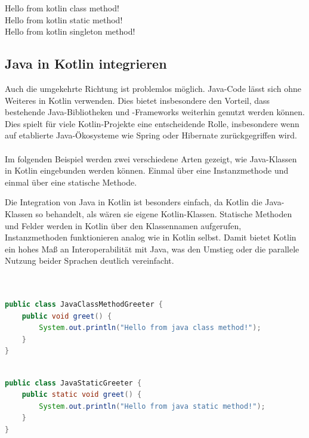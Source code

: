 \documentclass[11pt]{article}
\begin{document}
    \begin{tcolorbox}[colback=black!5!white, colframe=black, title=Ausgabe]
        Hello from kotlin class method!\\
        Hello from kotlin static method!\\
        Hello from kotlin singleton method!
    \end{tcolorbox}
    
    \subsection{Java in Kotlin integrieren}
    Auch die umgekehrte Richtung ist problemlos möglich.
    Java-Code lässt sich ohne Weiteres in Kotlin verwenden.
    Dies bietet insbesondere den Vorteil, dass bestehende Java-Bibliotheken und -Frameworks weiterhin genutzt werden können.
    Dies spielt für viele Kotlin-Projekte eine entscheidende Rolle, insbesondere wenn auf etablierte Java-Ökosysteme wie Spring oder Hibernate zurückgegriffen wird.\\
    \\
    Im folgenden Beispiel werden zwei verschiedene Arten gezeigt, wie Java-Klassen in Kotlin eingebunden werden können.
    Einmal über eine Instanzmethode und einmal über eine statische Methode.

    Die Integration von Java in Kotlin ist besonders einfach, da Kotlin die Java-Klassen so behandelt, als wären sie eigene Kotlin-Klassen.
    Statische Methoden und Felder werden in Kotlin über den Klassennamen aufgerufen, Instanzmethoden funktionieren analog wie in Kotlin selbst.
    Damit bietet Kotlin ein hohes Maß an Interoperabilität mit Java, was den Umstieg oder die parallele Nutzung beider Sprachen deutlich vereinfacht.\\
    \\

    \begin{lstlisting}[language=Java, caption={JavaClassMethodGreeter.java}]

public class JavaClassMethodGreeter {
    public void greet() {
        System.out.println("Hello from java class method!");
    }
}
    \end{lstlisting}

    \begin{lstlisting}[language=Java, caption={JavaStaticGreeter.java}]

public class JavaStaticGreeter {
    public static void greet() {
        System.out.println("Hello from java static method!");
    }
}

    \end{lstlisting}
\end{document}

